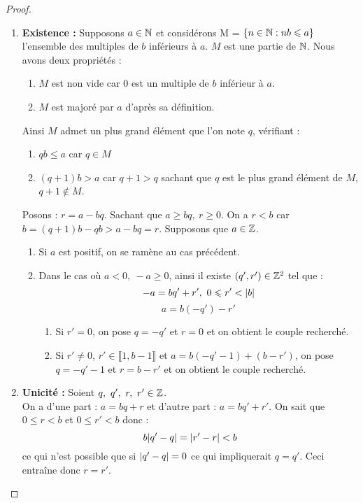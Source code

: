 \begin{proof}\cite{livre_prepa}
	
	\begin{enumerate}
		\item \textbf{Existence :} Supposons $a \in \mathbb{N}$ et considérons M = $\{n \in \mathbb{N} : nb \leqslant a\}$ l'ensemble des multiples de $b$ inférieurs à $a$. $M$ est une partie de $\mathbb{N}$. Nous avons deux propriétés : 
		\begin{enumerate}
			\item $M$ est non vide car 0 est un multiple de $b$ inférieur à $a$.
			\item $M$ est majoré par $a$ d'après sa définition.
		\end{enumerate}
		Ainsi $M$ admet un plus grand élément que l'on note $q$, vérifiant :
		\begin{enumerate}
			\item $qb \leq a$ car $q \in M$ 
			\item $(q + 1)b > a$ car $q + 1 > q$ sachant que $q$ est le plus grand élément de $M$, $q + 1 \notin M$.
		\end{enumerate}
		Posons : $r = a - bq$. Sachant que $a \geq bq,\ r \geq 0$. On a $r < b$ car $b = (q + 1)b - qb > a - bq = r$. Supposons que $a \in \mathbb{Z}$. 
		\begin{enumerate}
			\item Si $a$ est positif, on se ramène au cas précédent.
			\item Dans le cas où $a < 0,\ -a \geq 0$, ainsi il existe $(q', r') \in \mathbb{Z}^2$ tel que :
		\[ -a = bq' + r',\ 0 \leqslant r' < \abs{b} \]
		\[a = b(-q') - r' \]
			\begin{enumerate}
				\item Si $r' = 0$, on pose $q = -q'$ et $r = 0$ et on obtient le couple recherché.
				\item Si $r' \neq 0$, $r' \in \llbracket 1, b-1 \rrbracket$ et $a = b(-q' -1) + (b - r')$, on pose $q = -q' - 1$ et $r = b - r'$ et on obtient le couple recherché. 
			\end{enumerate}
		\end{enumerate}
		\item \textbf{Unicité :} Soient $q,\ q',\ r,\ r' \in \Z$. \\
	On a d'une part : $a = bq + r$ et d'autre part : $a = bq' + r'$.
	On sait que $0 \leq r < b$ et $0 \leq r' < b$ donc :
	\[ b \abs{q' - q} = \abs{r' - r} < b \]
	ce qui n'est possible que si $\abs{q' - q} = 0$ ce qui impliquerait $q = q'$. Ceci entraîne donc $r = r'$.
	\end{enumerate}
\end{proof}


